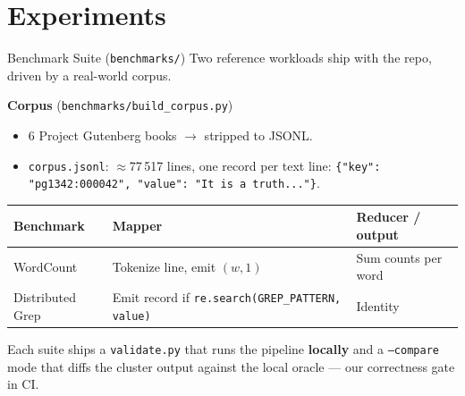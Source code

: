 \documentclass[11pt]{beamer}
\begin{document}
\section{Experiments}

\begin{frame}{Benchmark Suite (\texttt{benchmarks/})}
Two reference workloads ship with the repo, driven by a real-world corpus.

\vspace{0.3em}
\textbf{Corpus} (\texttt{benchmarks/build\_corpus.py})
\begin{itemize}\small
  \item 6 Project Gutenberg books $\to$ stripped to JSONL.
  \item \texttt{corpus.jsonl}: $\approx$\alert{77\,517 lines}, one record per text line:
        \texttt{\{"key": "pg1342:000042", "value": "It is a truth..."\}}.
\end{itemize}

\vspace{0.4em}
\begin{table}
\centering
\scriptsize
\begin{tabular}{lll}
\toprule
Benchmark             & Mapper                              & Reducer / output \\
\midrule
\alert{WordCount}     & Tokenize line, emit $(w, 1)$        & Sum counts per word \\
\alert{Distributed Grep} & Emit record if \texttt{re.search(GREP\_PATTERN, value)}
                                                            & Identity \\
\bottomrule
\end{tabular}
\end{table}

\vspace{0.4em}
Each suite ships a \texttt{validate.py} that runs the pipeline \textbf{locally}
and a \texttt{--compare} mode that diffs the cluster output against the local
oracle --- our \alert{correctness gate} in CI.
\end{frame}
\end{document}
